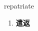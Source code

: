 
\begin{frame}
{\huge repatriate}
\begin{center}
\begin{enumerate}\Large
  \item \textbf{遣返}
\end{enumerate}
\end{center}
\end{frame}
